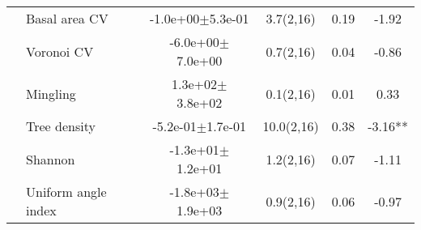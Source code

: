 \begin{longtable}{llcccS[table-format=-2.2, table-space-text-post = {***}]}
   \midrule
{} & Basal area CV & -1.0e+00$\pm$5.3e-01 & 3.7(2,16) & 0.19 & -1.92 \\* 
   & Voronoi CV & -6.0e+00$\pm$7.0e+00 & 0.7(2,16) & 0.04 & -0.86 \\* 
   & Mingling &  1.3e+02$\pm$3.8e+02 & 0.1(2,16) & 0.01 & 0.33 \\* 
   & Tree density & -5.2e-01$\pm$1.7e-01 & 10.0(2,16) & 0.38 & -3.16** \\* 
   & Shannon & -1.3e+01$\pm$1.2e+01 & 1.2(2,16) & 0.07 & -1.11 \\* 
   & Uniform angle index & -1.8e+03$\pm$1.9e+03 & 0.9(2,16) & 0.06 & -0.97 \\ 
   \bottomrule
\end{longtable}


